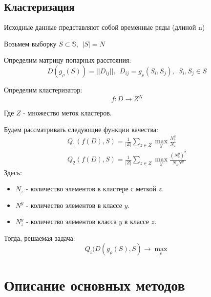 \documentclass[12pt,twoside]{article}
\begin{document}
        \subsection{Кластеризация}
        Исходные данные представляют собой временные ряды (длиной n)

        Возьмем выборку $ S \subset \mathbb{S}, \ \ |S| = N$

        Определим матрицу попарных расстояния:
        $$
            D(g_\rho(S)) = ||D_{ij}||, \ \ D_{ij} = g_\rho(S_i, S_j),\ \ S_i, S_j \in S 
        $$
        
        Определим кластеризатор:
        $$
            f: D \rightarrow Z^N
        $$

        Где $Z$ \-- множество меток кластеров.
				

        Будем рассматривать следующие функции качества:
        \begin{align*}
            Q_1(f(D), S) = \frac{1}{|Z|}\sum\limits_{z \in Z} \max_y \frac{N_z^y}{N_z}  \\
            Q_2(f(D), S) = \frac{1}{|Z|}\sum\limits_{z \in Z} \max_y \frac{(N_z^y)^2}{N_z N^y}
        \end{align*}
        Здесь: 
        \begin{itemize}[label=$\bullet$]
            \item $N_z$ \-- количество элементов в кластере с меткой $z$. 
            \item $N^y$ \-- количество элементов в классе $y$.
            \item $N_z^y$ \-- количество элементов класса $y$ в классе $z$.
        \end{itemize}

        Тогда, решаемая задача:
        $$
            Q_i(D(g_\rho(S), S) \rightarrow \max_{\rho}
        $$

                
    \section{Описание основных методов}
        
\end{document}
